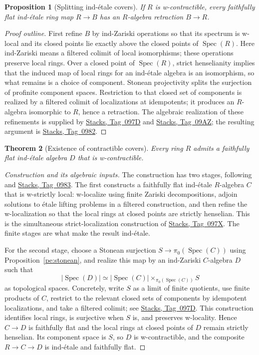\documentclass[11pt,a4paper]{article}
\numberwithin{equation}{section}
\newtheorem{theorem}{Theorem}[section]
\newtheorem{proposition}[theorem]{Proposition}
\theoremstyle{definition}
\theoremstyle{remark}
\newcommand{\stacks}[1]{\href{https://stacks.math.columbia.edu/tag/#1}{\textnormal{Stacks, Tag~#1}}}
\begin{document}
\begin{proposition}[Splitting ind-\'etale covers]
\label{pe:wc-rings}
If $R$ is w-contractible, every faithfully flat ind-\'etale ring map
$R\to B$ has an $R$-algebra retraction $B\to R$.
\end{proposition}
\begin{proof}[Proof outline]
First refine $B$ by ind-Zariski operations so that its spectrum is
w-local and its closed points lie exactly above the closed points of
$\operatorname{Spec}(R)$. Here ind-Zariski means a filtered colimit of
local isomorphisms; these operations preserve local rings.
Over a closed point of $\operatorname{Spec}(R)$, strict henselianity
implies that the induced map of local rings for an ind-\'etale algebra
is an isomorphism, so what remains is a choice of component. Stonean
projectivity splits the surjection of profinite component spaces.
Restriction to that closed set of components is realized by a filtered
colimit of localizations at idempotents; it produces an $R$-algebra
isomorphic to $R$, hence a retraction. The algebraic realization of
these refinements is supplied by \stacks{097D} and \stacks{09AZ}; the
resulting argument is \stacks{0982}.
\end{proof}

\begin{theorem}[Existence of contractible covers]
\label{pe:wc-cover}
Every ring $R$ admits a faithfully flat ind-\'etale algebra $D$ that
is w-contractible.
\end{theorem}
\begin{proof}[Construction and its algebraic inputs]
The construction has two stages, following \cite[Theorem~2.4.9]{BS}
and \stacks{0983}. The first constructs a faithfully flat ind-\'etale
$R$-algebra $C$ that is w-strictly local: w-localize using finite
Zariski decompositions, adjoin solutions to \'etale lifting problems in
a filtered construction, and then refine the w-localization so that the
local rings at closed points are strictly henselian. This is the
simultaneous strict-localization construction of \stacks{097X}. The
finite stages are what make the result ind-\'etale.

For the second stage, choose a Stonean surjection
$S\to\pi_0(\operatorname{Spec}(C))$ using
Proposition~\ref{pe:stonean}, and realize this map by an ind-Zariski
$C$-algebra $D$ such that
\[
 |\operatorname{Spec}(D)|
 \simeq |\operatorname{Spec}(C)|
       \times_{\pi_0(\operatorname{Spec}(C))}S
\]
as topological spaces. Concretely, write $S$ as a limit of finite
quotients, use finite products of $C$, restrict to the relevant
closed sets of components by idempotent localizations, and take a
filtered colimit; see \stacks{097D}. This construction identifies local
rings, is surjective when $S$ is, and preserves w-locality. Hence
$C\to D$ is faithfully flat and the local rings at closed points of
$D$ remain strictly henselian. Its component space is $S$, so $D$ is
w-contractible, and the composite $R\to C\to D$ is ind-\'etale and
faithfully flat.
\end{proof}
\end{document}
